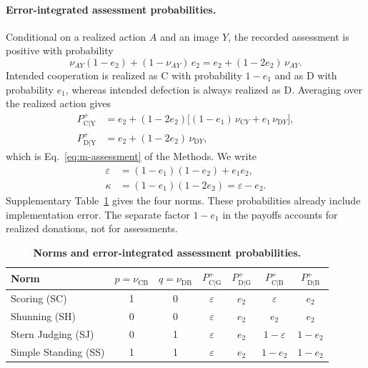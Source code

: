\documentclass[10pt]{wlscirep}
\newcommand{\Pp}[1]{P^{+}_{\mathrm{#1}}}   %
\theoremstyle{plain}
\theoremstyle{remark}
\begin{document}
\paragraph{Error-integrated assessment probabilities.} Conditional on a realized action $A$ and an image $Y$, the recorded assessment is positive with probability
\begin{equation}
\nu_{AY}(1-e_2)+(1-\nu_{AY})\,e_2=e_2+(1-2e_2)\,\nu_{AY}.
\label{eq:s-recorded}
\end{equation}
Intended cooperation is realized as C with probability $1-e_1$ and as D with probability $e_1$, whereas intended defection is always realized as D. Averaging over the realized action gives
\begin{equation}
\begin{aligned}
\Pp{C|Y}&=e_2+(1-2e_2)\bigl[(1-e_1)\,\nu_{\mathrm CY}+e_1\,\nu_{\mathrm DY}\bigr],\\
\Pp{D|Y}&=e_2+(1-2e_2)\,\nu_{\mathrm DY},
\end{aligned}
\label{eq:s-assessment-general}
\end{equation}
which is Eq.~\eqref{eq:m-assessment} of the Methods. We write
\begin{equation}
\begin{aligned}
\varepsilon&=(1-e_1)(1-e_2)+e_1e_2,\\
\kappa&=(1-e_1)(1-2e_2)=\varepsilon-e_2.
\end{aligned}
\label{eq:s-eps-kappa}
\end{equation}
Supplementary Table~\ref{tab:si-norms} gives the four norms. These probabilities already include implementation error. The separate factor $1-e_1$ in the payoffs accounts for realized donations, not for assessments.

\begin{table}[!htbp]
\centering
\caption{\textbf{Norms and error-integrated assessment probabilities.}}
\label{tab:si-norms}
\small
\begin{tabular}{@{}lcccccc@{}}
\toprule
Norm & $p=\nu_{\mathrm{CB}}$ & $q=\nu_{\mathrm{DB}}$ & $\Pp{C|G}$ & $\Pp{D|G}$ & $\Pp{C|B}$ & $\Pp{D|B}$\\
\midrule
Scoring (SC) & 1 & 0 & $\varepsilon$ & $e_2$ & $\varepsilon$ & $e_2$\\
Shunning (SH) & 0 & 0 & $\varepsilon$ & $e_2$ & $e_2$ & $e_2$\\
Stern Judging (SJ) & 0 & 1 & $\varepsilon$ & $e_2$ & $1-\varepsilon$ & $1-e_2$\\
Simple Standing (SS) & 1 & 1 & $\varepsilon$ & $e_2$ & $1-e_2$ & $1-e_2$\\
\bottomrule
\end{tabular}
\end{table}
\end{document}
